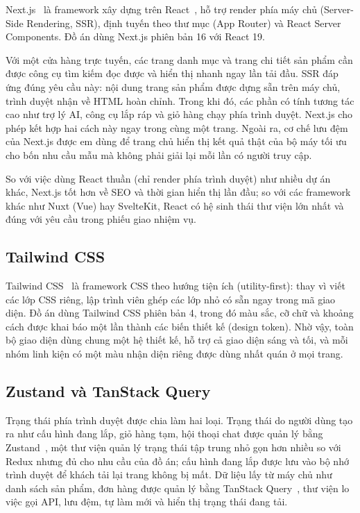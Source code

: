 Next.js~\cite{nextjs} là framework xây dựng trên React~\cite{react}, hỗ trợ render phía máy chủ (Server-Side Rendering, SSR), định tuyến theo thư mục (App Router) và React Server Components. Đồ án dùng Next.js phiên bản 16 với React 19.

Với một cửa hàng trực tuyến, các trang danh mục và trang chi tiết sản phẩm cần được công cụ tìm kiếm đọc được và hiển thị nhanh ngay lần tải đầu. SSR đáp ứng đúng yêu cầu này: nội dung trang sản phẩm được dựng sẵn trên máy chủ, trình duyệt nhận về HTML hoàn chỉnh. Trong khi đó, các phần có tính tương tác cao như trợ lý AI, công cụ lắp ráp và giỏ hàng chạy phía trình duyệt. Next.js cho phép kết hợp hai cách này ngay trong cùng một trang. Ngoài ra, cơ chế lưu đệm của Next.js được em dùng để trang chủ hiển thị kết quả thật của bộ máy tối ưu cho bốn nhu cầu mẫu mà không phải giải lại mỗi lần có người truy cập.

So với việc dùng React thuần (chỉ render phía trình duyệt) như nhiều dự án khác, Next.js tốt hơn về SEO và thời gian hiển thị lần đầu; so với các framework khác như Nuxt (Vue) hay SvelteKit, React có hệ sinh thái thư viện lớn nhất và đúng với yêu cầu trong phiếu giao nhiệm vụ.

\subsection{Tailwind CSS}

Tailwind CSS~\cite{tailwind} là framework CSS theo hướng tiện ích (utility-first): thay vì viết các lớp CSS riêng, lập trình viên ghép các lớp nhỏ có sẵn ngay trong mã giao diện. Đồ án dùng Tailwind CSS phiên bản 4, trong đó màu sắc, cỡ chữ và khoảng cách được khai báo một lần thành các biến thiết kế (design token). Nhờ vậy, toàn bộ giao diện dùng chung một hệ thiết kế, hỗ trợ cả giao diện sáng và tối, và mỗi nhóm linh kiện có một màu nhận diện riêng được dùng nhất quán ở mọi trang.

\subsection{Zustand và TanStack Query}

Trạng thái phía trình duyệt được chia làm hai loại. Trạng thái do người dùng tạo ra như cấu hình đang lắp, giỏ hàng tạm, hội thoại chat được quản lý bằng Zustand~\cite{zustand}, một thư viện quản lý trạng thái tập trung nhỏ gọn hơn nhiều so với Redux nhưng đủ cho nhu cầu của đồ án; cấu hình đang lắp được lưu vào bộ nhớ trình duyệt để khách tải lại trang không bị mất. Dữ liệu lấy từ máy chủ như danh sách sản phẩm, đơn hàng được quản lý bằng TanStack Query~\cite{tanstack}, thư viện lo việc gọi API, lưu đệm, tự làm mới và hiển thị trạng thái đang tải.

